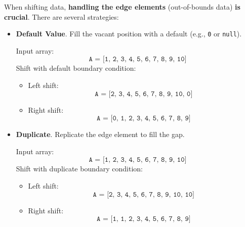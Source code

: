 \highspace
When shifting data, \textbf{handling the edge elements} (out-of-bounds data) \textbf{is crucial}. There are several strategies:
\begin{itemize}[label=\textcolor{Green3}{}]
    \item \textcolor{Green3}{\textbf{Default Value}}. Fill the vacant position with a default (e.g., \texttt{0} or \texttt{null}).
    \begin{examplebox}
        Input array:
        \begin{equation*}
            \texttt{A = [1, 2, 3, 4, 5, 6, 7, 8, 9, 10]}
        \end{equation*}
        Shift with default boundary condition:
        \begin{itemize}
            \item Left shift:
            \begin{equation*}
                \texttt{A = [2, 3, 4, 5, 6, 7, 8, 9, 10, 0]}
            \end{equation*}
            \item Right shift:
            \begin{equation*}
                \texttt{A = [0, 1, 2, 3, 4, 5, 6, 7, 8, 9]}
            \end{equation*}
        \end{itemize}
    \end{examplebox}

    \item \textcolor{Green3}{\textbf{Duplicate}}. Replicate the edge element to fill the gap.
    \begin{examplebox}
        Input array:
        \begin{equation*}
            \texttt{A = [1, 2, 3, 4, 5, 6, 7, 8, 9, 10]}
        \end{equation*}
        Shift with duplicate boundary condition:
        \begin{itemize}
            \item Left shift:
            \begin{equation*}
                \texttt{A = [2, 3, 4, 5, 6, 7, 8, 9, 10, 10]}
            \end{equation*}
            \item Right shift:
            \begin{equation*}
                \texttt{A = [1, 1, 2, 3, 4, 5, 6, 7, 8, 9]}
            \end{equation*}
        \end{itemize}
    \end{examplebox}


\end{itemize}
